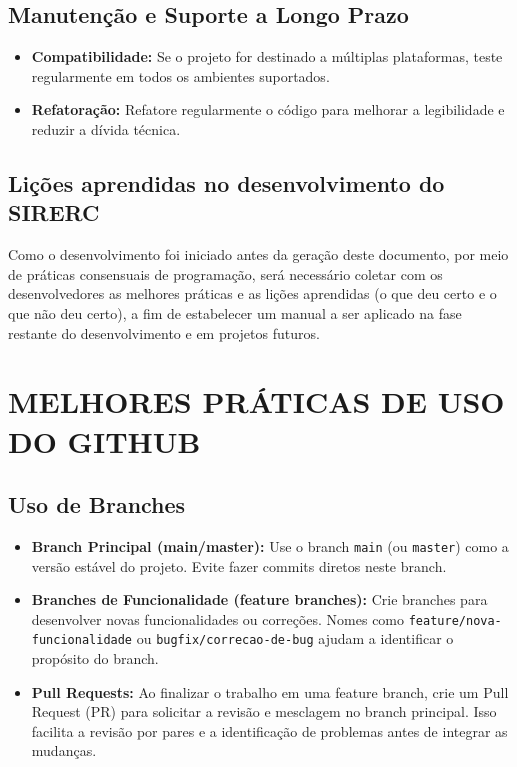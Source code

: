 \documentclass[a4paper,11pt]{article}
\newcommand{\sistema}{\textsf{SIRERC}}
\begin{document}
\subsection{Manutenção e Suporte a Longo Prazo}
\begin{itemize}
	\item \textbf{Compatibilidade:} Se o projeto for destinado a múltiplas plataformas, teste regularmente em todos os ambientes suportados.
	
	\item \textbf{Refatoração:} Refatore regularmente o código para melhorar a legibilidade e reduzir a dívida técnica.
\end{itemize}

\subsection{Lições aprendidas no desenvolvimento do \sistema{}}

Como o desenvolvimento foi iniciado antes da geração deste documento, por meio de práticas consensuais de programação, será necessário coletar com os desenvolvedores as melhores práticas e as lições aprendidas (o que deu certo e o que não deu certo), a fim de estabelecer um manual a ser aplicado na fase restante do desenvolvimento e em projetos futuros.

\section{MELHORES PRÁTICAS DE USO DO GITHUB}


\subsection{Uso de Branches}
\begin{itemize}
	\item \textbf{Branch Principal (main/master):} Use o branch \texttt{main} (ou \texttt{master}) como a versão estável do projeto. Evite fazer commits diretos neste branch.
	\item \textbf{Branches de Funcionalidade (feature branches):} Crie branches para desenvolver novas funcionalidades ou correções. Nomes como \texttt{feature/nova-funcionalidade} ou \texttt{bugfix/correcao-de-bug} ajudam a identificar o propósito do branch.
	\item \textbf{Pull Requests:} Ao finalizar o trabalho em uma feature branch, crie um Pull Request (PR) para solicitar a revisão e mesclagem no branch principal. Isso facilita a revisão por pares e a identificação de problemas antes de integrar as mudanças.
\end{itemize}
\end{document}
